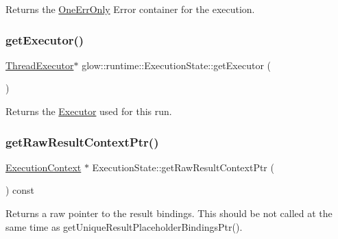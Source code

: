 \begin{DoxyReturn}{Returns}
the \hyperlink{classglow_1_1_one_err_only}{One\+Err\+Only} Error container for the execution. 
\end{DoxyReturn}
\mbox{\label{classglow_1_1runtime_1_1_execution_state_a376ef4a61f38f8b4266b7dc63dedb941}} 
\subsubsection{\texorpdfstring{get\+Executor()}{getExecutor()}}
{\footnotesize\ttfamily \hyperlink{classglow_1_1_thread_executor}{Thread\+Executor}$\ast$ glow\+::runtime\+::\+Execution\+State\+::get\+Executor (\begin{DoxyParamCaption}{ }\end{DoxyParamCaption})\hspace{0.3cm}{\ttfamily [inline]}}

\begin{DoxyReturn}{Returns}
the \hyperlink{classglow_1_1runtime_1_1_executor}{Executor} used for this run. 
\end{DoxyReturn}
\mbox{\label{classglow_1_1runtime_1_1_execution_state_a53a9f874acff138302be72f0b615a03a}} 
\subsubsection{\texorpdfstring{get\+Raw\+Result\+Context\+Ptr()}{getRawResultContextPtr()}}
{\footnotesize\ttfamily \hyperlink{classglow_1_1_execution_context}{Execution\+Context} $\ast$ Execution\+State\+::get\+Raw\+Result\+Context\+Ptr (\begin{DoxyParamCaption}{ }\end{DoxyParamCaption}) const}

\begin{DoxyReturn}{Returns}
a raw pointer to the result bindings. This should be not called at the same time as get\+Unique\+Result\+Placeholder\+Bindings\+Ptr(). 
\end{DoxyReturn}
\mbox{\label{classglow_1_1runtime_1_1_execution_state_a0bbac1a5ff3a157183a16e63c81a4f23}} 
